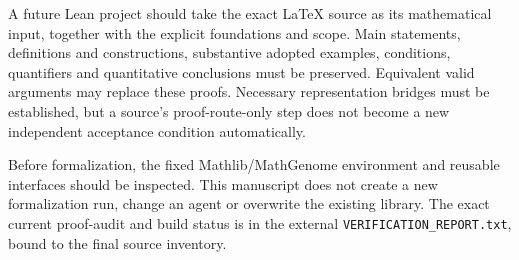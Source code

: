 \documentclass[11pt,oneside,openany]{book}
\theoremstyle{definition}
\theoremstyle{remark}
\newcounter{foundation}
\begin{document}
A future Lean project should take the exact LaTeX source as its mathematical
input, together with the explicit foundations and scope. Main statements,
definitions and constructions, substantive adopted examples, conditions,
quantifiers and quantitative conclusions must be preserved. Equivalent
valid arguments may replace these proofs. Necessary representation
bridges must be established, but a source's proof-route-only step does
not become a new independent acceptance condition automatically.

Before formalization, the fixed Mathlib/MathGenome environment and reusable
interfaces should be inspected. This manuscript does not create a new
formalization run, change an agent or overwrite the existing library.
The exact current proof-audit and build status is in the external
\texttt{VERIFICATION\_REPORT.txt}, bound to the final source inventory.

\end{document}
